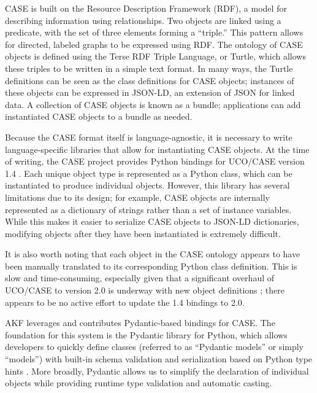 \documentclass[letterpaper,12pt]{report}
\begin{document}
CASE is built on the Resource Description Framework (RDF), a model for
describing information using relationships. Two objects are linked using
a predicate, with the set of three elements forming a ``triple.'' This
pattern allows for directed, labeled graphs to be expressed using RDF.
The ontology of CASE objects is defined using the Terse RDF Triple
Language, or Turtle, which allows these triples to be written in a
simple text format. In many ways, the Turtle definitions can be seen as
the class definitions for CASE objects; instances of these objects can
be expressed in JSON-LD, an extension of JSON for linked data. A
collection of CASE objects is known as a bundle; applications can add
instantiated CASE objects to a bundle as needed.

Because the CASE format itself is language-agnostic, it is necessary to
write language-specific libraries that allow for instantiating CASE
objects. At the time of writing, the CASE project provides Python
bindings for UCO/CASE version 1.4 \cite{CaseworkCASEMappingPython}.
Each unique object type is represented as a Python class, which can be
instantiated to produce individual objects. However, this library has
several limitations due to its design; for example, CASE objects are
internally represented as a dictionary of strings rather than a set of
instance variables. While this makes it easier to serialize CASE objects
to JSON-LD dictionaries, modifying objects after they have been
instantiated is extremely difficult.

It is also worth noting that each object in the CASE ontology appears to
have been manually translated to its corresponding Python class
definition. This is slow and time-consuming, especially given that a
significant overhaul of UCO/CASE to version 2.0 is underway with new
object definitions \cite{UcoProjectUCODevelop2002025}; there appears
to be no active effort to update the 1.4 bindings to 2.0.

AKF leverages and contributes Pydantic-based bindings for CASE. The
foundation for this system is the Pydantic library for Python, which
allows developers to quickly define classes (referred to as ``Pydantic
models'' or simply ``models'') with built-in schema validation and
serialization based on Python type hints \cite{colvinPydantic2024}.
More broadly, Pydantic allows us to simplify the declaration of
individual objects while providing runtime type validation and automatic
casting.
\end{document}
